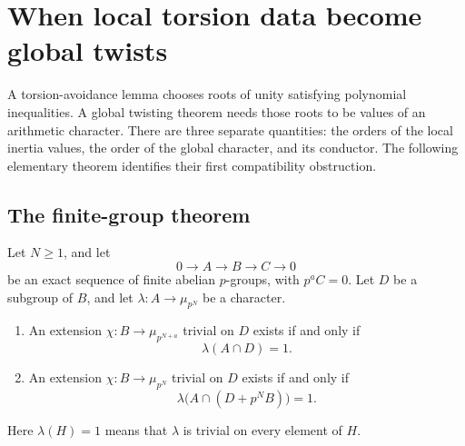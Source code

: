 \section{When local torsion data become global twists}\label{sec:characters}

A torsion-avoidance lemma chooses roots of unity satisfying polynomial inequalities. A global twisting theorem needs those roots to be values of an arithmetic character. There are three separate quantities: the orders of the local inertia values, the order of the global character, and its conductor. The following elementary theorem identifies their first compatibility obstruction.

\subsection{The finite-group theorem}

\begin{theorem}\label{thm:extension}
Let $N\ge1$, and let
\[
 0\longrightarrow A\longrightarrow B\longrightarrow C\longrightarrow0
\]
be an exact sequence of finite abelian $p$-groups, with $p^aC=0$. Let $D$ be a subgroup of $B$, and let $\lambda:A\to\mu_{p^N}$ be a character.
\begin{enumerate}
\item An extension $\chi:B\to\mu_{p^{N+a}}$ trivial on $D$ exists if and only if
\begin{equation}\label{eq:compat-raised}
              \lambda(A\cap D)=1.
\end{equation}
\item An extension $\chi:B\to\mu_{p^N}$ trivial on $D$ exists if and only if
\begin{equation}\label{eq:compat-exact}
              \lambda\bigl(A\cap(D+p^NB)\bigr)=1.
\end{equation}
\end{enumerate}
Here $\lambda(H)=1$ means that $\lambda$ is trivial on every element of $H$.
\end{theorem}


